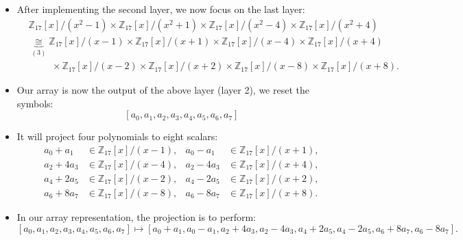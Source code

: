 \begin{frame}
    \begin{itemize}
        \item After implementing the second layer, we now focus on the last layer:
        \begin{align*}
            &\mathbb{Z}_{17}[x]/(x^{2}-1) \times \mathbb{Z}_{17}[x]/(x^{2}+1) \times \mathbb{Z}_{17}[x]/(x^{2}-4) \times \mathbb{Z}_{17}[x]/(x^{2}+4)\\
            &\underbrace{\cong}_{(3)} \mathbb{Z}_{17}[x]/(x-1) \times \mathbb{Z}_{17}[x]/(x+1) \times \mathbb{Z}_{17}[x]/(x-4) \times \mathbb{Z}_{17}[x]/(x+4) \\
            &\hspace{1cm} \times \mathbb{Z}_{17}[x]/(x-2) \times \mathbb{Z}_{17}[x]/(x+2) \times \mathbb{Z}_{17}[x]/(x-8) \times \mathbb{Z}_{17}[x]/(x+8).
        \end{align*}
        \item Our array is now the output of the above layer (layer 2), we reset the symbols:
        \[ [a_{0}, a_{1}, a_{2}, a_{3}, a_{4}, a_{5}, a_{6}, a_{7}] \]


        \item It will project four polynomials to eight scalars:
        \begin{align*}
            a_{0} + a_{1} &\in \mathbb{Z}_{17}[x]/(x - 1),&
            a_{0} - a_{1} &\in \mathbb{Z}_{17}[x]/(x + 1),\\
            a_{2} + 4a_{3} &\in \mathbb{Z}_{17}[x]/(x - 4),&
            a_{2} - 4a_{3} &\in \mathbb{Z}_{17}[x]/(x + 4),\\
            a_{4} + 2a_{5} &\in \mathbb{Z}_{17}[x]/(x - 2),&
            a_{4} - 2a_{5} &\in \mathbb{Z}_{17}[x]/(x + 2),\\
            a_{6} + 8a_{7} &\in \mathbb{Z}_{17}[x]/(x - 8),&
            a_{6} - 8a_{7} &\in \mathbb{Z}_{17}[x]/(x + 8).
        \end{align*}
        \item In our array representation, the projection is to perform:
        \[ 
        [a_{0}, a_{1}, a_{2}, a_{3}, a_{4}, a_{5}, a_{6}, a_{7}] \mapsto 
        [a_{0} + a_{1}, a_{0} - a_{1}, a_{2} + 4a_{3}, a_{2} - 4a_{3}, a_{4} + 2a_{5}, a_{4} - 2a_{5}, a_{6} + 8a_{7}, a_{6} - 8a_{7}].
        \]


    \end{itemize}
\end{frame}

